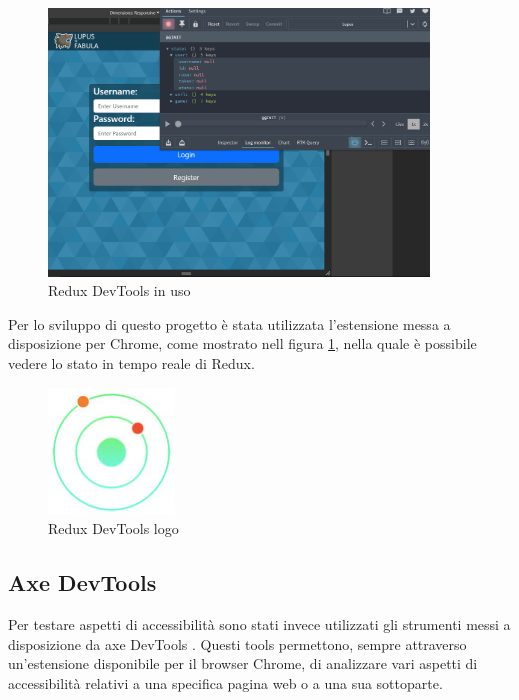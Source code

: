 \begin{figure}[H]
\centering
\includegraphics[width=0.9\textwidth]{img/screen/redux_devtools_usage.png}
\caption{Redux DevTools in uso}
\label{fig:reduxDevTools}
\end{figure}

Per lo sviluppo di questo progetto è stata utilizzata l'estensione messa a disposizione per Chrome, come mostrato nell figura \ref{fig:reduxDevTools}, nella quale è possibile vedere lo stato in tempo reale di Redux.

\begin{figure}[H]
\centering
\includegraphics[width=0.3\textwidth]{img/logos/redux_devtool.jpg}
\caption{Redux DevTools logo}
\label{fig:reduxDevToolsLogo}
\end{figure}


\subsection{Axe DevTools}

Per testare aspetti di accessibilità sono stati invece utilizzati gli strumenti messi a disposizione da axe DevTools \cite{dequeDevToolsDeveloper}.
Questi tools permettono, sempre attraverso un'estensione disponibile per il browser Chrome, di analizzare vari aspetti di accessibilità relativi a una specifica pagina web o a una sua sottoparte. 

